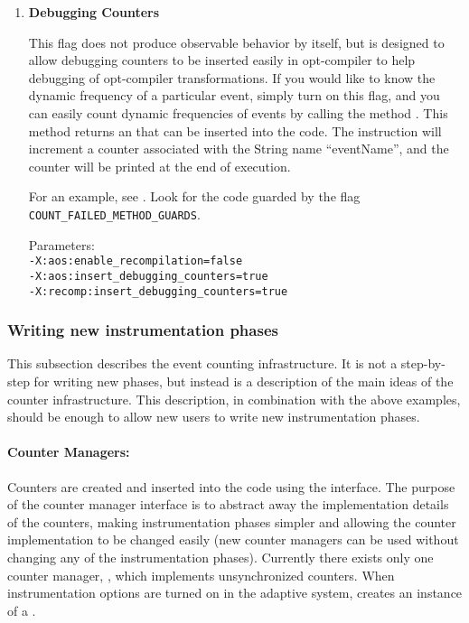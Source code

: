 \begin{enumerate}
\item {\bf Debugging Counters}  

This flag does not produce observable behavior by itself, but is
designed to allow debugging counters to be inserted easily in
opt-compiler to help debugging of opt-compiler transformations.
If you would like to know the dynamic frequency of a particular
event, simply turn on this flag, and you can easily count dynamic
frequencies of events by calling the method
.  This method
returns an 
that can be inserted into the
code.  The instruction will increment a counter associated with
the String name ``eventName'', and the counter will be printed at the
end of execution.

For an example, see 
.  
Look
for the code guarded by the flag {\tt COUNT\_FAILED\_METHOD\_GUARDS}.
 
Parameters:\\
{\tt -X:aos:enable\_recompilation=false \\
-X:aos:insert\_debugging\_counters=true \\
-X:recomp:insert\_debugging\_counters=true}

\end{enumerate}

\subsubsection{Writing new instrumentation phases}
\label{adding_phases}
This subsection describes the event counting infrastructure.  It is
not a step-by-step for writing new phases, but instead is a
description of the main ideas of the counter infrastructure.
This description, in combination with the above examples, should be
enough to allow new users to write new instrumentation phases.

\paragraph{Counter Managers:}  Counters are created and inserted into
the code using the 
interface.
The purpose of the counter manager interface is to abstract away the
implementation details of the counters, making instrumentation
phases simpler and allowing the counter implementation to be changed
easily (new counter managers can be used without changing any of the
instrumentation phases).  Currently there exists only one counter
manager, 
, which implements unsynchronized
counters.
When instrumentation options
are turned on in the adaptive system, 
creates an instance of a .

